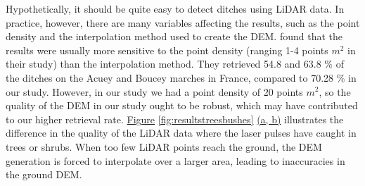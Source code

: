 \documentclass[11pt, review]{elsarticle} %
\begin{document}
Hypothetically, it should be quite easy to detect ditches using LiDAR data. In practice, however, there are many variables affecting the results, such as the point density and the interpolation method used to create the DEM. \citet{rapinel} found that the results were usually more sensitive to the point density (ranging 1-4 points $m^{2}$ in their study) than the interpolation method. They retrieved 54.8 and 63.8 \% of the ditches on the Acuey and Boucey marches in France, compared to 70.28 \% in our study. However, in our study we had a point density of 20 points $m^{2}$, so the quality of the DEM in our study ought to be robust, which may have contributed to our higher retrieval rate. \hyperref[fig:resultstreesbushes]{Figure} \ref{fig:resultstreesbushes} \hyperref[fig:resultstreesbushes]{(a, b)} illustrates the difference in the quality of the LiDAR data where the laser pulses have caught in trees or shrubs. When too few LiDAR points reach the ground, the DEM generation is forced to interpolate over a larger area, leading to inaccuracies in the ground DEM.
\end{document}
